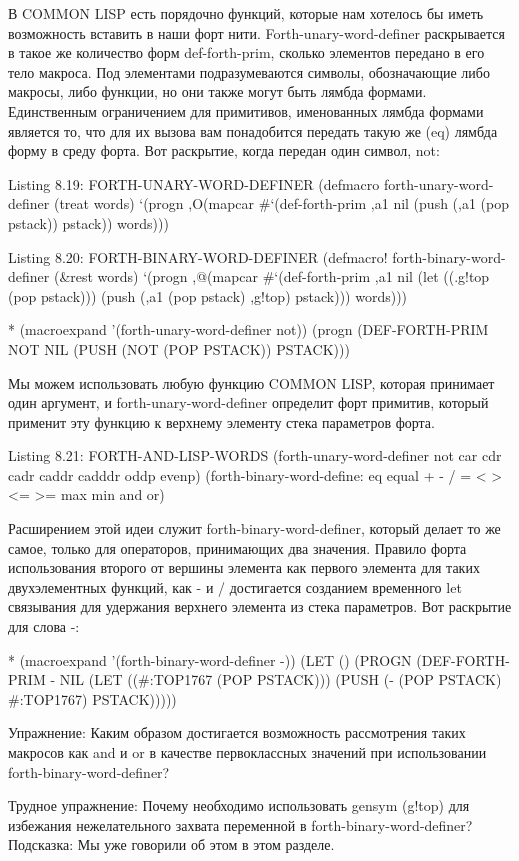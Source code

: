 {{{В COMMON LISP есть порядочно функций, которые нам хотелось бы иметь возможность вставить в наши форт нити. Forth-unary-word-definer раскрывается в такое же количество форм def-forth-prim, сколько элементов передано в его тело макроса. Под элементами подразумеваются символы,  обозначающие либо макросы, либо функции, но они также могут быть лямбда формами. Единственным ограничением для примитивов, именованных лямбда формами является то, что для их вызова вам понадобится передать такую же (eq) лямбда форму в среду форта. Вот раскрытие, когда передан один символ, not: 

Listing 8.19: FORTH-UNARY-WORD-DEFINER
(defmacro forth-unary-word-definer (treat words)
‘(progn
,O(mapcar
#‘(def-forth-prim ,a1 nil
(push (,a1 (pop pstack))
pstack))
words)))

Listing 8.20: FORTH-BINARY-WORD-DEFINER
(defmacro! forth-binary-word-definer (&rest words)
‘(progn
,@(mapcar
#‘(def-forth-prim ,a1 nil
(let ((.g!top (pop pstack)))
(push (,a1 (pop pstack)
,g!top)
pstack)))
words)))

* (macroexpand
’(forth-unary-word-definer
not))
(progn
(DEF-FORTH-PRIM NOT NIL
(PUSH (NOT (POP PSTACK))
PSTACK)))

Мы можем использовать любую функцию COMMON LISP, которая принимает один аргумент, и forth-unary-word-definer определит форт примитив, который применит эту функцию к верхнему элементу стека параметров форта.

Listing 8.21: FORTH-AND-LISP-WORDS
(forth-unary-word-definer
not car cdr cadr caddr cadddr
oddp evenp)
(forth-binary-word-define:
eq equal + - / = < > <= >=
max min and or)

Расширением этой идеи служит forth-binary-word-definer, который делает то же самое, только для операторов, принимающих два значения. Правило форта использования второго от вершины элемента как первого элемента для таких двухэлементных функций, как - и / достигается созданием временного let связывания для удержания верхнего элемента из стека параметров. Вот раскрытие для слова -:

* (macroexpand
’(forth-binary-word-definer
-))
(LET ()
(PROGN
(DEF-FORTH-PRIM - NIL
(LET ((#:TOP1767 (POP PSTACK)))
(PUSH (- (POP PSTACK) #:TOP1767)
PSTACK)))))

Упражнение: Каким образом достигается возможность рассмотрения таких макросов как and и or в качестве первоклассных значений при использовании forth-binary-word-definer?

Трудное упражнение: Почему необходимо использовать gensym (g!top) для избежания нежелательного захвата переменной в forth-binary-word-definer? Подсказка: Мы уже говорили об этом в этом разделе.

}}}

